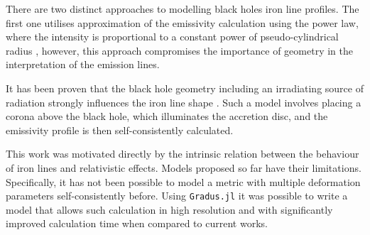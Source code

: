 \documentclass[fleqn,usenatbib,useAMS]{mnras}
\begin{document}
There are two distinct approaches to modelling black holes iron line profiles. The first one utilises approximation of the emissivity calculation using the power law, where the intensity is proportional to a constant power of pseudo-cylindrical radius \citep{abdikamalov2020testing}, however, this approach compromises the importance of geometry in the interpretation of the emission lines.

It has been proven that the black hole geometry including an irradiating source of radiation strongly influences the iron line shape \citep{dauser2016relativistic}. Such a model involves placing a corona above the black hole, which illuminates the accretion disc, and the emissivity profile is then self-consistently calculated. 

This work was motivated directly by the intrinsic relation between the behaviour of iron lines and relativistic effects. Models proposed so far have their limitations. Specifically, it has not been possible to model a metric with multiple deformation parameters self-consistently before. Using {\tt Gradus.jl} it was possible to write a model that allows such calculation in high resolution and with significantly improved calculation time when compared to current works.

\end{document}
